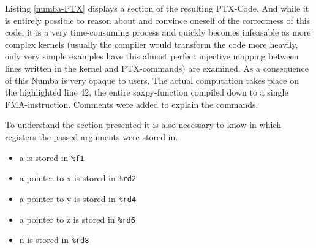 \documentclass[english,11pt,a4paper,table]{article} %
\begin{document}
Listing \ref{numba-PTX} displays a section of the resulting PTX-Code.
And while it is entirely possible to reason about and convince oneself of the correctness of this code, it is a very time-consuming process and quickly becomes infeasable as more complex kernels (usually the compiler would transform the code more heavily, only very simple examples have this almost perfect injective mapping between lines written in the kernel and PTX-commands) are examined.
As a consequence of this Numba is very opaque to users.
The actual computation takes place on the highlighted line 42, the entire saxpy-function compiled down to a single FMA-instruction.
Comments were added to explain the commands.

To understand the section presented it is also necessary to know in which registers the passed arguments were stored in.
\begin{itemize}
	\item a is stored in \texttt{\%f1}
	\item a pointer to x is stored in \texttt{\%rd2}
	\item a pointer to y is stored in \texttt{\%rd4}
	\item a pointer to z is stored in \texttt{\%rd6}
	\item n is stored in \texttt{\%rd8}
\end{itemize}
\end{document}
